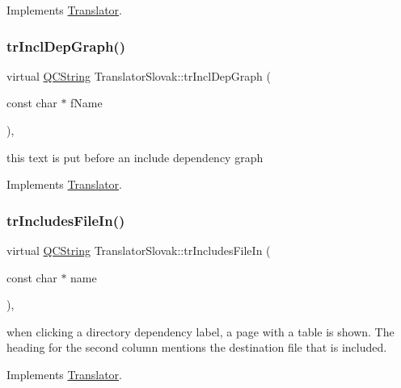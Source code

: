 Implements \mbox{\hyperlink{class_translator}{Translator}}.

\mbox{\label{class_translator_slovak_a2553b6c6359c885ab2536a496712803b}} 
\subsubsection{\texorpdfstring{trInclDepGraph()}{trInclDepGraph()}}
{\footnotesize\ttfamily virtual \mbox{\hyperlink{class_q_c_string}{Q\+C\+String}} Translator\+Slovak\+::tr\+Incl\+Dep\+Graph (\begin{DoxyParamCaption}\item[{const char $\ast$}]{f\+Name }\end{DoxyParamCaption})\hspace{0.3cm}{\ttfamily [inline]}, {\ttfamily [virtual]}}

this text is put before an include dependency graph 

Implements \mbox{\hyperlink{class_translator}{Translator}}.

\mbox{\label{class_translator_slovak_a67cc741796096072099779e710727270}} 
\subsubsection{\texorpdfstring{trIncludesFileIn()}{trIncludesFileIn()}}
{\footnotesize\ttfamily virtual \mbox{\hyperlink{class_q_c_string}{Q\+C\+String}} Translator\+Slovak\+::tr\+Includes\+File\+In (\begin{DoxyParamCaption}\item[{const char $\ast$}]{name }\end{DoxyParamCaption})\hspace{0.3cm}{\ttfamily [inline]}, {\ttfamily [virtual]}}

when clicking a directory dependency label, a page with a table is shown. The heading for the second column mentions the destination file that is included. 

Implements \mbox{\hyperlink{class_translator}{Translator}}.

\mbox{\label{class_translator_slovak_add168397141e8bc2a7660ad2c4afc83d}} 
